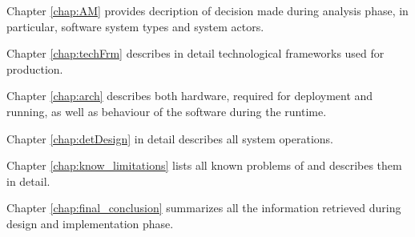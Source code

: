 Chapter \ref{chap:AM} provides decription of decision made during analysis
phase, in particular, software system types and system actors.

Chapter \ref{chap:techFrm} describes in detail technological frameworks used
 for \mysystemname production.

Chapter \ref{chap:arch} describes both hardware, required for \mysystemname
deployment and running, as well as behaviour of the software during the
 runtime.

Chapter \ref{chap:detDesign} in detail describes all system operations.

Chapter \ref{chap:know_limitations} lists all known problems of \mysystemname
and describes them in detail.

Chapter \ref{chap:final_conclusion} summarizes all the information retrieved
during design and implementation phase.
